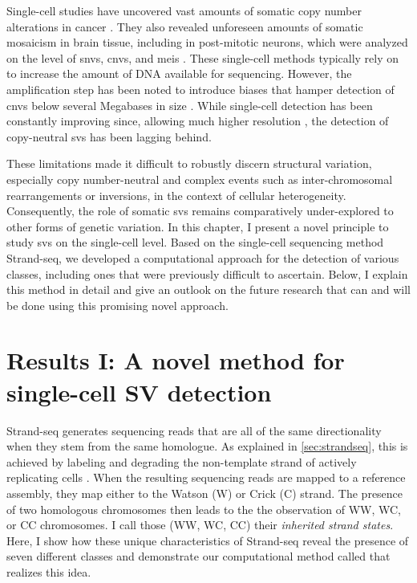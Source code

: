 Single-cell studies have uncovered vast amounts of somatic copy number
alterations in cancer \citep{Navin2011,Demeulemeester2016}. They also revealed
unforeseen amounts of somatic mosaicism in brain tissue, including in
post-mitotic neurons, which were analyzed on the level of \acp{snv}, \acp{cnv},
and \acp{mei} \citep{Lodato2015,Cai2014,Evrony2012}.
These single-cell methods typically rely on 
to increase the amount of DNA available for sequencing. However, the amplification step has been noted to
introduce biases that hamper detection of \acp{cnv} below several Megabases in
size \citep{Deleye2017}. While single-cell \cnv detection has been
constantly improving since, allowing much higher resolution
\citep{Garvin2015,Gao2016,Bakker2016,Knouse2016}, the detection of copy-neutral \acp{sv} has
been lagging behind.

These limitations made it difficult to robustly discern structural variation,
especially copy number-neutral and complex events such as inter-chromosomal
rearrangements or inversions, in the context of cellular
heterogeneity. Consequently, the role of somatic \acp{sv} remains comparatively
under-explored to other forms of genetic variation. In this chapter, I present a
novel principle to study \acp{sv} on the single-cell level. Based on the
single-cell sequencing method Strand-seq, we developed a computational approach
for the detection of various \sv classes, including ones that were previously
difficult to ascertain. Below, I
explain this method in detail and give an outlook on the future research that
can and will be done using this promising novel approach.






\section{Results I: A novel method for single-cell SV detection}
\label{sec:mosaic_mc}

Strand-seq generates sequencing reads that are all of the same directionality
when they stem from the same homologue. As explained in \cref{sec:strandseq},
this is achieved by labeling and degrading the non-template strand of
actively replicating cells \citep{Falconer2012,Sanders2017}. When the resulting sequencing reads are mapped to a
reference assembly, they map either to the Watson (W) or Crick (C) strand. The
presence of two homologous chromosomes then leads to the the observation of WW, WC, or CC
chromosomes. I call those (WW, WC, CC) their \emph{inherited strand states}.
Here, I show how these unique characteristics of Strand-seq reveal the presence
of seven different \sv classes and demonstrate our computational method called
\mc that realizes this idea.




